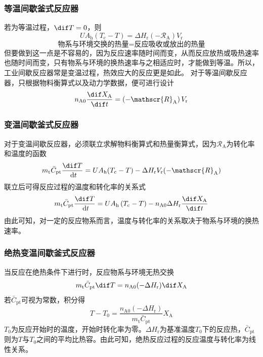 \begin{frame}
    \frametitle{等温间歇釜式反应器}

    \large 若为等温过程，$\dif T=0$，则
    \[
        U A_{\mathrm{h}}(T_{\mathrm{c}}-T) = \Delta H_{\mathrm{r}}(-\mathscr{R}_{\mathrm{A}}) V_{\mathrm{r}}
    \]
    \[
        \text{物系与环境交换的热量} = \text{反应吸收或放出的热量}
    \]
    但要做到这一点是不容易的，因为反应速率随时间而变，从而反应放热或吸热速率也随时间而变，只有物系与环境的换热速率与之相适应时，才能做到等温。所以，工业间歇反应器常是变温过程，热效应大的反应更是如此。
    对于等温间歇反应器，只根据物料衡算式以及动力学数据，便可进行设计
    \[
        n_{\mathrm{A} 0} \frac{\dif  X_{\mathrm{A}}}{\dif  t}=\left(-\mathscr{R}_{\mathrm{A}}\right) V_{\mathrm{r}}
    \]
\end{frame}


\begin{frame}
    \frametitle{变温间歇釜式反应器}
    对于变温间歇反应器，必须联立求解物料衡算式和热量衡算式，因为$\mathcal{R}_\mathrm{A}$为转化率和温度的函数
    \[
        m_{\mathrm{t}} \bar{C}_{\mathrm{pt}} \frac{\dif  T}{\mathrm{~d} t}=U A_{\mathrm{h}}(T_{\mathrm{c}}-T)-\Delta H_{\mathrm{r}} V_{\mathrm{r}}(-\mathscr{R}_{\mathrm{A}})
    \]
    联立后可得反应过程的温度和转化率的关系式
    \[
        m_{\mathrm{t}} \bar{C}_{\mathrm{pt}} \frac{\dif  T}{\mathrm{~d} t}=U A_{\mathrm{h}}\left(T_{\mathrm{c}}-T\right)-n_{\mathrm{A} 0} \Delta H_{\mathrm{r}} \frac{\dif  X_{\mathrm{A}}}{\dif  t}
    \]
    由此可知，对一定的反应物系而言，温度与转化率的关系取决于物系与环境的换热速率。

\end{frame}


\begin{frame}
    \frametitle{绝热变温间歇釜式反应器}

    \large 当反应在绝热条件下进行时，反应物系与环境无热交换
    \[
        m_{\mathrm{t}} \bar{C}_{\mathrm{pt}} \dif  T=n_{\mathrm{A} 0}(-\Delta H_{\mathrm{r}}) \dif  X_{\mathrm{A}}
    \]
    若$\bar{C}_{\mathrm{pt}}$可视为常数，积分得
    \[
        T-T_{0}=\frac{n_{\mathrm{A} 0}(-\Delta H_{\mathrm{r}})}{m_{\mathrm{t}} \bar{C}_{\mathrm{pt}}} X_{\mathrm{A}}
    \]
    $T_0$为反应开始时的温度，开始时转化率为零。$\Delta H_{\mathrm{r}}$为基准温度$T_0$下的反应热，$\bar{C}_{\mathrm{pt}}$则为$T$与$T_0$之间的平均比热容。由此可知，绝热反应过程的反应温度与转化率为线性关系。

\end{frame}

